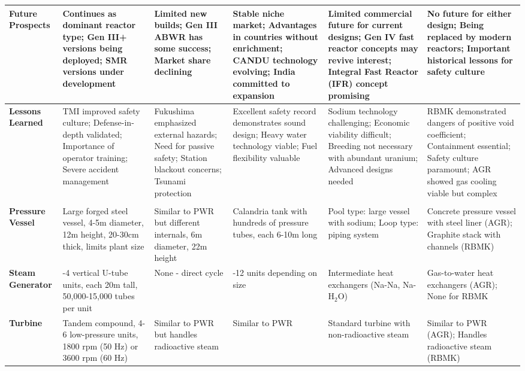 \documentclass{article}
\begin{document}
\begin{longtable}{>{\raggedright\arraybackslash}p{3.5cm}*{5}{>{\raggedright\arraybackslash}p{3.2cm}}}
\textbf{Future Prospects} & Continues as dominant reactor type; Gen III+ versions being deployed; SMR versions under development & Limited new builds; Gen III ABWR has some success; Market share declining & Stable niche market; Advantages in countries without enrichment; CANDU technology evolving; India committed to expansion & Limited commercial future for current designs; Gen IV fast reactor concepts may revive interest; Integral Fast Reactor (IFR) concept promising & No future for either design; Being replaced by modern reactors; Important historical lessons for safety culture \\
\midrule

\textbf{Lessons Learned} & TMI improved safety culture; Defense-in-depth validated; Importance of operator training; Severe accident management & Fukushima emphasized external hazards; Need for passive safety; Station blackout concerns; Tsunami protection & Excellent safety record demonstrates sound design; Heavy water technology viable; Fuel flexibility valuable & Sodium technology challenging; Economic viability difficult; Breeding not necessary with abundant uranium; Advanced designs needed & RBMK demonstrated dangers of positive void coefficient; Containment essential; Safety culture paramount; AGR showed gas cooling viable but complex \\
\midrule

\multicolumn{6}{l}{\textbf{\Large Technical Specifications}} \\
\midrule

\textbf{Pressure Vessel} & Large forged steel vessel, 4-5m diameter, 12m height, 20-30cm thick, limits plant size & Similar to PWR but different internals, 6m diameter, 22m height & Calandria tank with hundreds of pressure tubes, each 6-10m long & Pool type: large vessel with sodium; Loop type: piping system & Concrete pressure vessel with steel liner (AGR); Graphite stack with channels (RBMK) \\
\midrule

\textbf{Steam Generator} & 2-4 vertical U-tube units, each 20m tall, 50,000-15,000 tubes per unit & None - direct cycle & 4-12 units depending on size & Intermediate heat exchangers (Na-Na, Na-H$_2$O) & Gas-to-water heat exchangers (AGR); None for RBMK \\
\midrule

\textbf{Turbine} & Tandem compound, 4-6 low-pressure units, 1800 rpm (50 Hz) or 3600 rpm (60 Hz) & Similar to PWR but handles radioactive steam & Similar to PWR & Standard turbine with non-radioactive steam & Similar to PWR (AGR); Handles radioactive steam (RBMK) \\
\midrule


\end{longtable}
\end{document}
